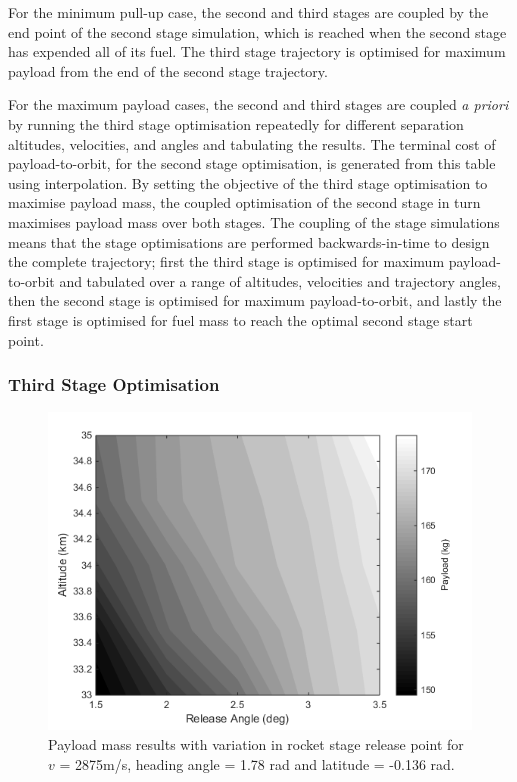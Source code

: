 \documentclass[journal]{new-aiaa}
\begin{document}
	 For the minimum pull-up case, the second and third stages are coupled by the end point of the second stage simulation, which is reached when the second stage has expended all of its fuel. The third stage trajectory is optimised for maximum payload from the end of the second stage trajectory.
	 
	 For the maximum payload cases, the second and third stages are coupled \textit{a priori} by running the third stage optimisation repeatedly for different separation altitudes, velocities, and angles and tabulating the results. The terminal cost of payload-to-orbit, for the second stage optimisation, is generated from this table using interpolation. By setting the objective of the third stage optimisation to maximise payload mass, the coupled optimisation of the second stage in turn maximises payload mass over both stages. 
	 The coupling of the stage simulations means that the stage optimisations are performed backwards-in-time to design the complete trajectory; first the third stage is optimised for maximum payload-to-orbit and tabulated over a range of altitudes, velocities and trajectory angles, then the second stage is optimised for maximum payload-to-orbit, and lastly the first stage is optimised for fuel mass to reach the optimal second stage start point. 
	 
	 
	 
	  \subsubsection{Third Stage Optimisation} \label{section:thirdstage}
	  
	   \begin{figure}[t]
	   	\begin{center}
	   		\includegraphics[width=0.6\linewidth]{contours}
	   		\caption{Payload mass results with variation in rocket stage release point for $v$ = 2875m/s, heading angle = 1.78 rad and latitude = -0.136 rad.}
	   		\label{fig:contours}
	   	\end{center}
	   \end{figure}
	   
\end{document}

